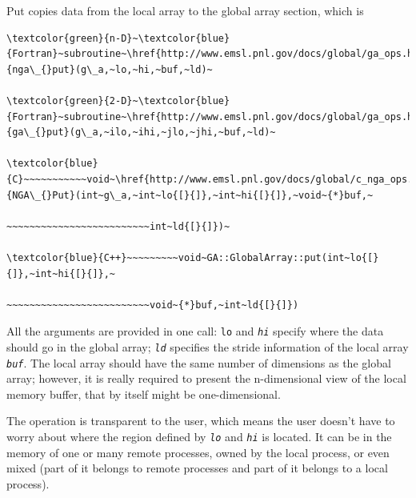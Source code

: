 Put copies data from the local array to the global array section,
which is
\begin{verbatim}
\textcolor{green}{n-D}~\textcolor{blue}{Fortran}~subroutine~\href{http://www.emsl.pnl.gov/docs/global/ga_ops.html\#ga_put}{nga\_{}put}(g\_a,~lo,~hi,~buf,~ld)~

\textcolor{green}{2-D}~\textcolor{blue}{Fortran}~subroutine~\href{http://www.emsl.pnl.gov/docs/global/ga_ops.html\#ga_put}{ga\_{}put}(g\_a,~ilo,~ihi,~jlo,~jhi,~buf,~ld)~

\textcolor{blue}{C}~~~~~~~~~~~void~\href{http://www.emsl.pnl.gov/docs/global/c_nga_ops.html\#ga_put}{NGA\_{}Put}(int~g\_a,~int~lo{[}{]},~int~hi{[}{]},~void~{*}buf,~

~~~~~~~~~~~~~~~~~~~~~~~~~int~ld{[}{]})~

\textcolor{blue}{C++}~~~~~~~~~void~GA::GlobalArray::put(int~lo{[}{]},~int~hi{[}{]},~

~~~~~~~~~~~~~~~~~~~~~~~~~void~{*}buf,~int~ld{[}{]})
\end{verbatim}
All the arguments are provided in one call: \texttt{lo} and \texttt{\emph{hi}}
specify where the data should go in the global array; \texttt{\emph{ld}}
specifies the stride information of the local array \texttt{\emph{buf}}.
The local array should have the same number of dimensions as the global
array; however, it is really required to present the n-dimensional
view of the local memory buffer, that by itself might be one-dimensional.

The operation is transparent to the user, which means the user doesn't
have to worry about where the region defined by \texttt{\emph{lo}}
and \texttt{\emph{hi}} is located. It can be in the memory of one
or many remote processes, owned by the local process, or even mixed
(part of it belongs to remote processes and part of it belongs to
a local process).

